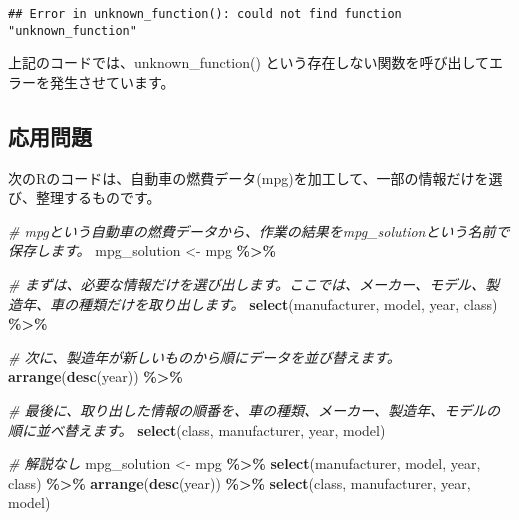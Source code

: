 \documentclass[
]{article}
\newenvironment{Shaded}{\begin{snugshade}}{\end{snugshade}}
\newcommand{\CommentTok}[1]{\textcolor[rgb]{0.56,0.35,0.01}{\textit{#1}}}
\newcommand{\FunctionTok}[1]{\textcolor[rgb]{0.13,0.29,0.53}{\textbf{#1}}}
\newcommand{\NormalTok}[1]{#1}
\newcommand{\OtherTok}[1]{\textcolor[rgb]{0.56,0.35,0.01}{#1}}
\newcommand{\SpecialCharTok}[1]{\textcolor[rgb]{0.81,0.36,0.00}{\textbf{#1}}}
\begin{document}
\begin{verbatim}
## Error in unknown_function(): could not find function "unknown_function"
\end{verbatim}

上記のコードでは、unknown\_function()
という存在しない関数を呼び出してエラーを発生させています。

\hypertarget{ux5fdcux7528ux554fux984c}{%
\subsection{応用問題}\label{ux5fdcux7528ux554fux984c}}

次のRのコードは、自動車の燃費データ(mpg)を加工して、一部の情報だけを選び、整理するものです。

\begin{Shaded}
\begin{Highlighting}[]
\CommentTok{\# mpgという自動車の燃費データから、作業の結果をmpg\_solutionという名前で保存します。}
\NormalTok{mpg\_solution }\OtherTok{\textless{}{-}}\NormalTok{ mpg }\SpecialCharTok{\%\textgreater{}\%}  

  \CommentTok{\# まずは、必要な情報だけを選び出します。ここでは、メーカー、モデル、製造年、車の種類だけを取り出します。}
  \FunctionTok{select}\NormalTok{(manufacturer, model, year, class) }\SpecialCharTok{\%\textgreater{}\%}  

  \CommentTok{\# 次に、製造年が新しいものから順にデータを並び替えます。}
  \FunctionTok{arrange}\NormalTok{(}\FunctionTok{desc}\NormalTok{(year)) }\SpecialCharTok{\%\textgreater{}\%}  

  \CommentTok{\# 最後に、取り出した情報の順番を、車の種類、メーカー、製造年、モデルの順に並べ替えます。}
  \FunctionTok{select}\NormalTok{(class, manufacturer, year, model)  }
\end{Highlighting}
\end{Shaded}

\begin{Shaded}
\begin{Highlighting}[]
\CommentTok{\# 解説なし}
\NormalTok{mpg\_solution }\OtherTok{\textless{}{-}}\NormalTok{ mpg }\SpecialCharTok{\%\textgreater{}\%}  
  \FunctionTok{select}\NormalTok{(manufacturer, model, year, class) }\SpecialCharTok{\%\textgreater{}\%}  
  \FunctionTok{arrange}\NormalTok{(}\FunctionTok{desc}\NormalTok{(year)) }\SpecialCharTok{\%\textgreater{}\%} 
  \FunctionTok{select}\NormalTok{(class, manufacturer, year, model)  }
\end{Highlighting}
\end{Shaded}
\end{document}
